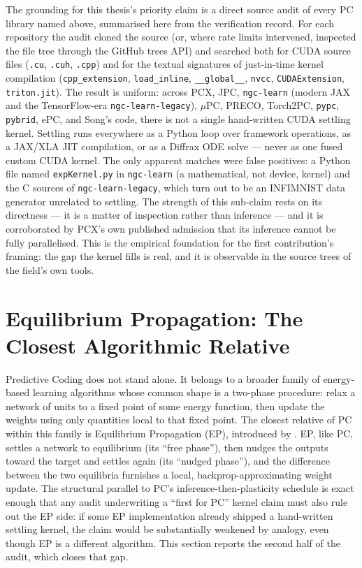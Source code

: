 The grounding for this thesis's priority claim is a direct source audit of every PC library
named above, summarised here from the verification record. For each repository the audit
cloned the source (or, where rate limits intervened, inspected the file tree through the
GitHub trees API) and searched both for CUDA source files (\texttt{.cu}, \texttt{.cuh},
\texttt{.cpp}) and for the textual signatures of just-in-time kernel compilation
(\texttt{cpp\_extension}, \texttt{load\_inline}, \texttt{\_\_global\_\_}, \texttt{nvcc},
\texttt{CUDAExtension}, \texttt{triton.jit}). The result is uniform: across PCX, JPC,
\texttt{ngc-learn} (modern JAX and the TensorFlow-era \texttt{ngc-learn-legacy}), $\mu$PC,
PRECO, Torch2PC, \texttt{pypc}, \texttt{pybrid}, ePC, and Song's code, there is not a single
hand-written CUDA settling kernel. Settling runs everywhere as a Python loop over framework
operations, as a JAX/XLA JIT compilation, or as a Diffrax ODE solve --- never as one fused
custom CUDA kernel. The only apparent matches were false positives: a Python file named
\texttt{expKernel.py} in \texttt{ngc-learn} (a mathematical, not device, kernel) and the C
sources of \texttt{ngc-learn-legacy}, which turn out to be an INFIMNIST data generator
unrelated to settling. The strength of this sub-claim rests on its directness --- it is a
matter of inspection rather than inference --- and it is corroborated by PCX's own published
admission that its inference cannot be fully parallelised. This is the empirical foundation
for the first contribution's framing: the gap the kernel fills is real, and it is observable
in the source trees of the field's own tools.

\section{Equilibrium Propagation: The Closest Algorithmic Relative}

Predictive Coding does not stand alone. It belongs to a broader family of energy-based
learning algorithms whose common shape is a two-phase procedure: relax a network of units
to a fixed point of some energy function, then update the weights using only quantities
local to that fixed point. The closest relative of PC within this family is Equilibrium
Propagation (EP), introduced by \citet{scellier2017ep}. EP, like PC, settles a network to
equilibrium (its ``free phase''), then nudges the outputs toward the target and settles
again (its ``nudged phase''), and the difference between the two equilibria furnishes a
local, backprop-approximating weight update. The structural parallel to PC's
inference-then-plasticity schedule is exact enough that any audit underwriting a
``first for PC'' kernel claim must also rule out the EP side: if some EP implementation
already shipped a hand-written settling kernel, the claim would be substantially weakened
by analogy, even though EP is a different algorithm. This section reports the second half
of the audit, which closes that gap.

